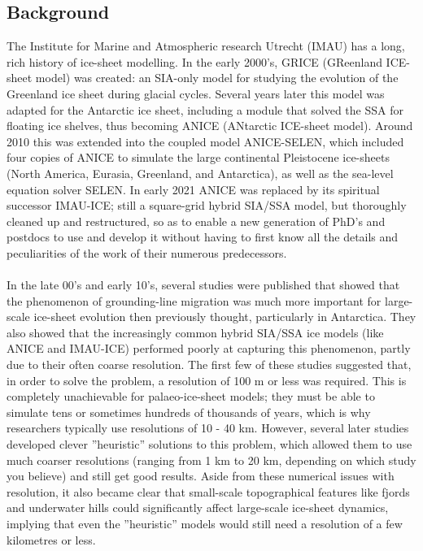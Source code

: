 \documentclass{article}
\begin{document}
\subsection{Background}

The Institute for Marine and Atmospheric research Utrecht (IMAU) has a long, rich history of ice-sheet modelling. In the early 2000's, GRICE (GReenland ICE-sheet model) was created: an SIA-only model   for studying the evolution of the Greenland ice sheet during glacial cycles. Several years later this model was adapted for the Antarctic ice sheet, including a module that solved the SSA for floating ice shelves, thus becoming ANICE (ANtarctic ICE-sheet model). Around 2010 this was extended into the coupled model ANICE-SELEN, which included four copies of ANICE to simulate the large continental Pleistocene ice-sheets (North America, Eurasia, Greenland, and Antarctica), as well as the sea-level equation solver SELEN. In early 2021 ANICE was replaced by its spiritual successor IMAU-ICE; still a square-grid hybrid SIA/SSA model, but thoroughly cleaned up and restructured, so as to enable a new generation of PhD's and postdocs to use and develop it without having to first know all the details and peculiarities of the work of their numerous predecessors.\\
\\
In the late 00's and early 10's, several studies were published that showed that the phenomenon of grounding-line migration was much more important for large-scale ice-sheet evolution then previously thought, particularly in Antarctica. They also showed that the increasingly common hybrid SIA/SSA ice models (like ANICE and IMAU-ICE) performed poorly at capturing this phenomenon, partly due to their often coarse resolution. The first few of these studies suggested that, in order to solve the problem, a resolution of 100 m or less was required. This is completely unachievable for palaeo-ice-sheet models; they must be able to simulate tens or sometimes hundreds of thousands of years, which is why researchers typically use resolutions of 10 - 40 km. However, several later studies developed clever ''heuristic'' solutions to this problem, which allowed them to use much coarser resolutions (ranging from 1 km to 20 km, depending on which study you believe) and still get good results. Aside from these numerical issues with resolution, it also became clear that small-scale topographical features like fjords and underwater hills could significantly affect large-scale ice-sheet dynamics, implying that even the ''heuristic'' models would still need a resolution of a few kilometres or less.\\
\end{document}
